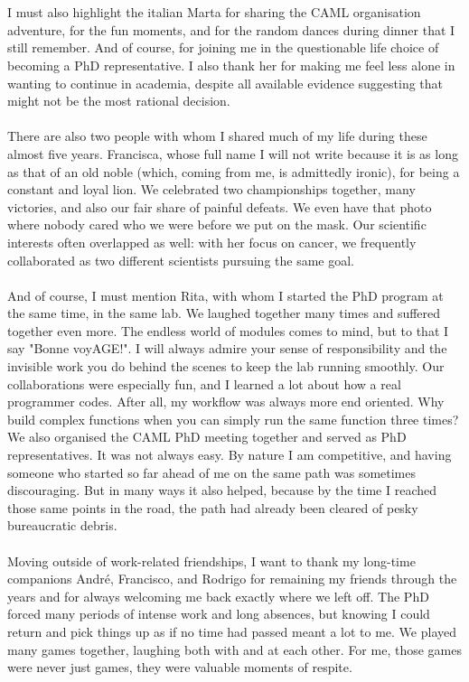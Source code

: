\\
\\
I must also highlight the italian Marta for sharing the CAML organisation adventure, for the fun moments, and for the random dances during dinner that I still remember. And of course, for joining me in the questionable life choice of becoming a PhD representative. I also thank her for making me feel less alone in wanting to continue in academia, despite all available evidence suggesting that might not be the most rational decision.
\\
\\
There are also two people with whom I shared much of my life during these almost five years. Francisca, whose full name I will not write because it is as long as that of an old noble (which, coming from me, is admittedly ironic), for being a constant and loyal lion. We celebrated two championships together, many victories, and also our fair share of painful defeats. We even have that photo where nobody cared who we were before we put on the mask. Our scientific interests often overlapped as well: with her focus on cancer, we frequently collaborated as two different scientists pursuing the same goal.
\\
\\
And of course, I must mention Rita, with whom I started the PhD program at the same time, in the same lab. We laughed together many times and suffered together even more. The endless world of modules comes to mind, but to that I say "Bonne voyAGE!". I will always admire your sense of responsibility and the invisible work you do behind the scenes to keep the lab running smoothly. Our collaborations were especially fun, and I learned a lot about how a real programmer codes. After all, my workflow was always more end oriented. Why build complex functions when you can simply run the same function three times?
We also organised the CAML PhD meeting together and served as PhD representatives. It was not always easy. By nature I am competitive, and having someone who started so far ahead of me on the same path was sometimes discouraging. But in many ways it also helped, because by the time I reached those same points in the road, the path had already been cleared of pesky bureaucratic debris.
\\
\\
Moving outside of work-related friendships, I want to thank my long-time companions André, Francisco, and Rodrigo for remaining my friends through the years and for always welcoming me back exactly where we left off. The PhD forced many periods of intense work and long absences, but knowing I could return and pick things up as if no time had passed meant a lot to me. We played many games together, laughing both with and at each other. For me, those games were never just games, they were valuable moments of respite.

